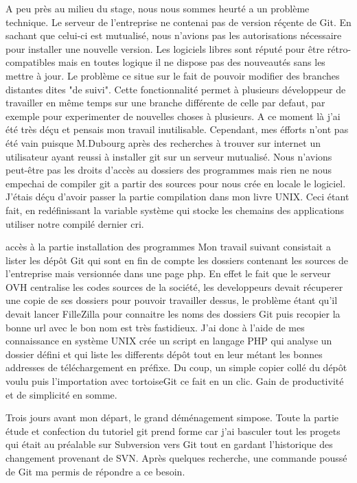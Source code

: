 A peu près au milieu du stage, nous nous sommes heurté a un problème technique. Le serveur de l'entreprise ne contenai pas de version réçente de Git.
En sachant que celui-ci est mutualisé, nous n'avions pas les autorisations nécessaire pour installer une nouvelle version. Les logiciels libres sont
réputé pour être rétro-compatibles mais en toutes logique il ne dispose pas des nouveautés sans les mettre à jour. Le problème ce situe sur le fait de
pouvoir modifier des branches distantes dites "de suivi". Cette fonctionnalité permet à plusieurs développeur de travailler en même temps sur une branche différente de
celle par defaut, par exemple pour experimenter de nouvelles choses à plusieurs. A ce moment là j'ai été très déçu et pensais mon travail
inutilisable. Cependant, mes éfforts n'ont pas été vain puisque M.Dubourg après des recherches à trouver sur internet un utilisateur ayant reussi à
installer git sur un serveur mutualisé. Nous n'avions peut-être pas les droits d'accès au dossiers des programmes mais rien ne nous empechai de
compiler git a partir des sources pour nous crée en locale le logiciel. J'étais déçu d'avoir passer la partie compilation dans mon livre UNIX.
Ceci étant fait, en redéfinissant la variable système qui stocke les chemains des applications utiliser notre compilé dernier cri.

accès à la partie installation des programmes
Mon travail suivant consistait a lister les dépôt Git qui sont en fin de compte les dossiers contenant les sources de l'entreprise mais versionnée
dans une page php. En effet le fait que le serveur OVH centralise les codes sources de la société, les developpeurs devait récuperer une copie de ses
dossiers pour pouvoir travailler dessus, le problème étant qu'il devait lancer FilleZilla pour connaitre les noms des dossiers Git puis recopier la
bonne url avec le bon nom est très fastidieux. J'ai donc à l'aide de mes connaissance en système UNIX crée un script en langage PHP qui analyse un
dossier défini et qui liste les differents dépôt tout en leur métant les bonnes addresses de téléchargement en préfixe. Du coup, un simple copier
collé du dépôt voulu puis l'importation avec tortoiseGit ce fait en un clic. Gain de productivité et de simplicité en somme.

Trois jours avant mon départ, le grand déménagement simpose. Toute la partie étude et confection du tutoriel git prend forme car j'ai basculer tout
les progets qui était au préalable sur Subversion vers Git tout en gardant l'historique des changement provenant de SVN. Après quelques recherche, une
commande poussé de Git ma permis de répondre a ce besoin.

